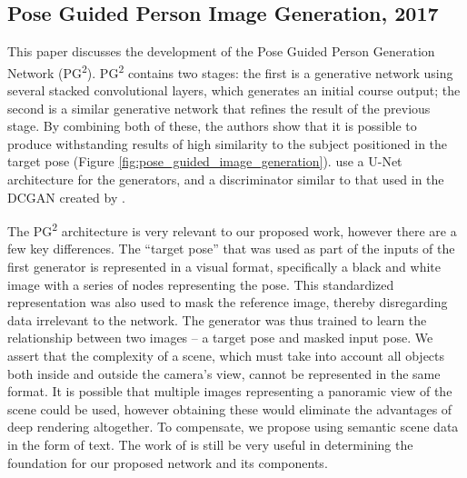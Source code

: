 \documentclass{article}
\begin{document}
\subsection*{Pose Guided Person Image Generation, 2017}
\nocite{pose_guided_image_generation}
This paper discusses the development of the Pose Guided Person Generation
Network (PG\textsuperscript{2}). PG\textsuperscript{2} contains two stages:
the first is a generative network using several stacked convolutional layers,
which generates an initial course output;
the second is a similar generative network that refines the
result of the previous stage. By combining both of these,
the authors show that it is possible to produce withstanding results of
high similarity to the subject positioned in the target pose
(Figure \ref{fig:pose_guided_image_generation}).
\cite{pose_guided_image_generation} use a U-Net architecture for the generators, 
and a discriminator
similar to that used in the DCGAN created by
\cite{unsupervised_learning}.

The PG\textsuperscript{2} architecture is very relevant to our proposed work,
however there are a few key differences. The ``target pose'' that was used as 
part of the inputs of the first generator is represented in a visual format,
specifically a black and white image with a series of nodes representing the
pose. This standardized representation was also used to mask the reference image,
thereby disregarding data irrelevant to the network.
The generator was thus trained to learn the relationship between two
images -- a target pose and masked input pose. We assert that the complexity of a
scene, which must take into account all objects both
inside and outside the camera's view, cannot be represented in the same format.
It is possible that multiple images representing a panoramic view of the scene
could be used, however obtaining these would eliminate the advantages of deep
rendering altogether. To compensate, we propose using semantic scene data in the
form of text. The work of \cite{pose_guided_image_generation}
is still be very useful in determining the
foundation for our proposed network and its components.
\end{document}
